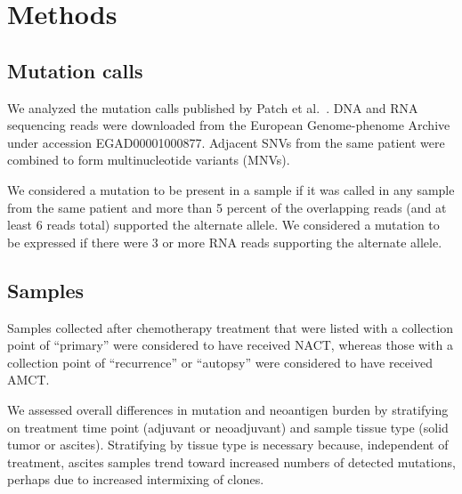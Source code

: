 \section*{Methods}

\subsection*{Mutation calls}
We analyzed the mutation calls published by Patch et al.~\cite{Patch_2015}. DNA and RNA sequencing reads were downloaded from the European Genome-phenome Archive under accession EGAD00001000877. Adjacent SNVs from the same patient were combined to form multinucleotide variants (MNVs).


We considered a mutation to be present in a sample if it was called in any sample from the same patient and more than 5 percent of the overlapping reads (and at least 6 reads total) supported the alternate allele. We considered a mutation to be expressed if there were 3 or more RNA reads supporting the alternate allele.

\subsection*{Samples}
Samples collected after chemotherapy treatment that were listed with a collection point of ``primary'' were considered to have received NACT, whereas those with a collection point of ``recurrence'' or ``autopsy'' were considered to have received AMCT.

We assessed overall differences in mutation and neoantigen burden by stratifying on treatment time point (adjuvant or neoadjuvant) and sample tissue type (solid tumor or ascites). Stratifying by tissue type is necessary because, independent of treatment, ascites samples trend toward increased numbers of detected mutations, perhaps due to increased intermixing of clones.



